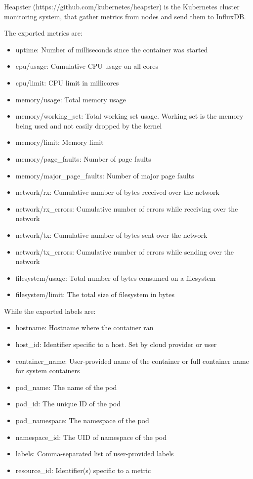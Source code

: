 Heapster (https://github.com/kubernetes/heapster) is the Kubernetes
cluster monitoring system, that gather metrics from nodes and send them
to InfluxDB.

The exported metrics are:

\begin{itemize}
\itemsep1pt\parskip0pt
\item
  uptime: Number of milliseconds since the container was started
\item
  cpu/usage: Cumulative CPU usage on all cores
\item
  cpu/limit: CPU limit in millicores
\item
  memory/usage: Total memory usage
\item
  memory/working\_set: Total working set usage. Working set is the
  memory being used and not easily dropped by the kernel
\item
  memory/limit: Memory limit
\item
  memory/page\_faults: Number of page faults
\item
  memory/major\_page\_faults: Number of major page faults
\item
  network/rx: Cumulative number of bytes received over the network
\item
  network/rx\_errors: Cumulative number of errors while receiving over
  the network
\item
  network/tx: Cumulative number of bytes sent over the network
\item
  network/tx\_errors: Cumulative number of errors while sending over the
  network
\item
  filesystem/usage: Total number of bytes consumed on a filesystem
\item
  filesystem/limit: The total size of filesystem in bytes
\end{itemize}

While the exported labels are:

\begin{itemize}
\itemsep1pt\parskip0pt
\item
  hostname: Hostname where the container ran
\item
  host\_id: Identifier specific to a host. Set by cloud provider or user
\item
  container\_name: User-provided name of the container or full container
  name for system containers
\item
  pod\_name: The name of the pod
\item
  pod\_id: The unique ID of the pod
\item
  pod\_namespace: The namespace of the pod
\item
  namespace\_id: The UID of namespace of the pod
\item
  labels: Comma-separated list of user-provided labels
\item
  resource\_id: Identifier(s) specific to a metric
\end{itemize}

